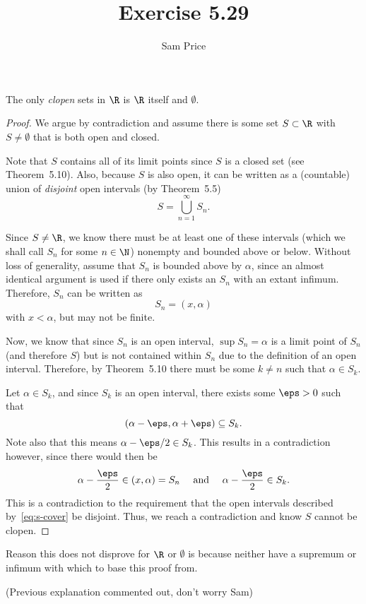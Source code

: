 \documentclass{article}
\author{Sam Price}
\date{}
\title{Exercise 5.29}
\begin{document}
\maketitle

\begin{thm}
  The only \emph{clopen} sets in $\R$ is $\R$ itself and $\emptyset$.
\end{thm}

\begin{proof}
  We argue by contradiction and assume there is some set $S \subset \R$ with $S \ne \emptyset$ that is both open and closed.

  Note that $S$ contains all of its limit points since $S$ is a closed set (see Theorem~5.10).
  Also, because $S$ is also open, it can be written as a (countable) union of \emph{disjoint} open intervals (by Theorem~5.5)
  \begin{equation}\label{eq:s-cover} S = \bigcup_{n = 1}^{\infty}S_{n}. \end{equation}

  Since $S \ne \R$, we know there must be at least one of these intervals (which we shall call $S_{n}$ for some $n \in \N$)
  nonempty and bounded above or below. Without loss of generality, assume that $S_{n}$ is bounded above by $\alpha$,
  since an almost identical argument is used if there only exists an $S_{n}$ with an extant infimum.
  Therefore, $S_{n}$ can be written as
  \[ S_{n} = (x, \alpha) \]
  with $x < \alpha$, but may not be finite.

  Now, we know that since $S_{n}$ is an open interval, $\sup S_{n} = \alpha$ is a limit point of $S_{n}$
  (and therefore $S$) but is not contained within $S_{n}$ due to the definition of an open interval.
  Therefore, by Theorem~5.10 there must be some $k \ne n$ such that $\alpha \in S_{k}$.

  Let $\alpha \in S_{k}$, and since $S_{k}$ is an open interval, there exists some $\eps > 0$ such that
  \[ (\alpha - \eps, \alpha + \eps) \subseteq S_{k}. \]
  Note also that this means $\alpha - \eps/2 \in S_{k}$.
  This results in a contradiction however, since there would then be
  \[ \alpha - \frac{\eps}{2} \in (x, \alpha) = S_{n} \quad\text{ and }\quad \alpha - \frac{\eps}{2} \in S_{k}. \]
  This is a contradiction to the requirement that the open intervals described by~\eqref{eq:s-cover} be disjoint.
  Thus, we reach a contradiction and know $S$ cannot be clopen.
\end{proof}

Reason this does not disprove for $\R$ or $\emptyset$ is because neither have a supremum or infimum with which to base this proof from.

\vspace{1.5cm}
(Previous explanation commented out, don't worry Sam)

\end{document}
